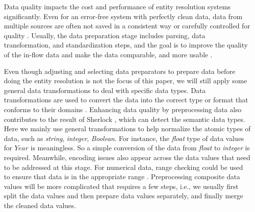 Data quality impacts the cost and performance of entity resolution systems significantly. Even for an error-free system with perfectly clean data, data from multiple sources are often not saved in a consistent way or carefully controlled for quality \cite{elmagarmid_duplicate_2007}. Usually, the data preparation stage includes parsing, data transformation, and standardization steps, and the goal is to improve the quality of the in-flow data and make the data comparable, and more usable \cite{elmagarmid_duplicate_2007}. 

Even though adjusting and selecting data preparators to prepare data before doing the entity resolution is not the focus of this paper, we will still apply some general data transformations to deal with specific data types. Data transformations are used to convert the data into the correct type or format that conforms to their domains \cite{elmagarmid_duplicate_2007}. Enhancing data quality by preprocessing data also contributes to the result of Sherlock \cite{hulsebos_sherlock_2019}, which can detect the semantic data types. Here we mainly use general transformations to help normalize the atomic types of data, such as \textit{string}, \textit{integer}, \textit{Boolean}. For instance, the \textit{float} type of data values for $Year$ is meaningless. So a simple conversion of the data from \textit{float} to \textit{integer} is required. Meanwhile, encoding issues also appear across the data values that need to be addressed at this stage. For numerical data, range checking could be used to ensure that data is in the appropriate range \cite{elmagarmid_duplicate_2007}. Preprocessing composite data values will be more complicated that requires a few steps, i.e., we usually first split the data values and then prepare data values separately, and finally merge the cleaned data values.



